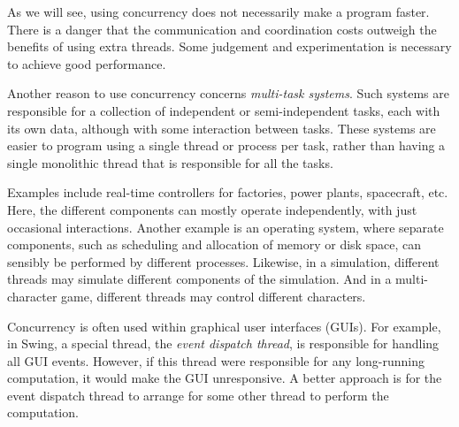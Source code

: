 As we will see, using concurrency does not necessarily make a program faster.
There is a danger that the communication and coordination costs outweigh the
benefits of using extra threads.  Some judgement and experimentation is
necessary to achieve good performance. 


Another reason to use concurrency concerns \emph{multi-task
systems}.  Such systems are responsible for a
collection of independent or semi-independent tasks, each with its own data,
although with some interaction between tasks.  These systems are easier to
program using a single thread or process per task, rather than having a single
monolithic thread that is responsible for all the tasks.

Examples include real-time controllers for factories, power plants,
spacecraft, etc.  Here, the different components can mostly operate
independently, with just occasional interactions.  Another example is an
operating system, where separate components, such as scheduling and allocation
of memory or disk space, can sensibly be performed by different processes.
Likewise, in a simulation, different threads may simulate different components
of the simulation.  And in a multi-character game, different threads may
control different characters.

Concurrency is often used within graphical user interfaces (GUIs).  For
example, in Swing, a special thread, the \emph{event dispatch thread}, is
responsible for handling all GUI events.  However, if this thread were
responsible for any long-running computation, it would make the GUI
unresponsive.  A better approach is for the event dispatch thread to arrange
for some other thread to perform the computation. 



